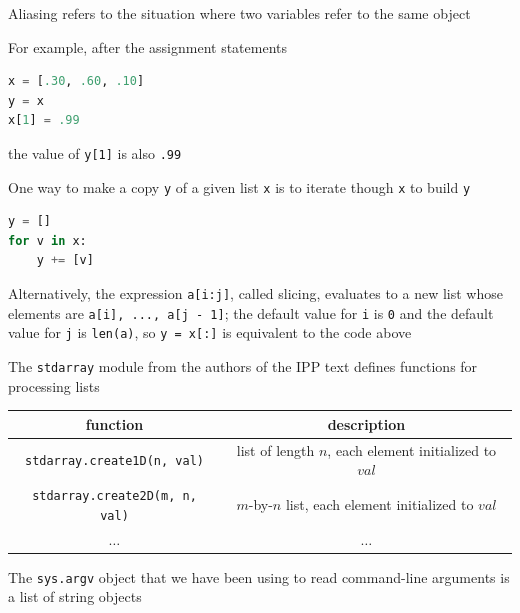 \documentclass[8pt,a4paper,compress]{beamer}
\begin{document}
\begin{frame}[fragile]
\pause

Aliasing refers to the situation where two variables refer to the same object

\pause
\bigskip

For example, after the assignment statements
\begin{lstlisting}[language=Python]
x = [.30, .60, .10]
y = x
x[1] = .99
\end{lstlisting}
the value of \lstinline{y[1]} is also \lstinline{.99}

\pause
\bigskip

One way to make a copy \lstinline{y} of a given list \lstinline{x} is to iterate though \lstinline{x} to build \lstinline{y}
\begin{lstlisting}[language=Python]
y = []
for v in x:
    y += [v]
\end{lstlisting}

\pause
\bigskip

Alternatively, the expression \lstinline{a[i:j]}, called slicing,  evaluates to a new list whose elements are \lstinline{a[i], ..., a[j - 1]}; the default value for \lstinline{i} is \lstinline{0} and the default value for \lstinline{j} is \lstinline{len(a)}, so \lstinline{y = x[:]} is equivalent to the code above

\pause
\bigskip

The \lstinline{stdarray} module from the authors of the IPP text defines functions for processing lists

\begin{center}
\begin{tabular}{cc}
function & description \\ \hline
\lstinline$stdarray.create1D(n, val)$ & list of length $n$, each element initialized to $val$ \\
\lstinline$stdarray.create2D(m, n, val)$ & $m$-by-$n$ list, each element initialized to $val$ \\
$\dots$ & $\dots$
\end{tabular} 
\end{center}

\pause
\bigskip

The \lstinline{sys.argv} object that we have been using to read command-line arguments is a list of string objects
\end{frame}
\end{document}
